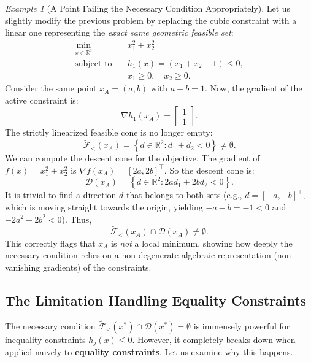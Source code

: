 \documentclass[11pt]{article}
\theoremstyle{definition}
\theoremstyle{plain}
\theoremstyle{remark}
\newtheorem{example}{Example}
\begin{document}
\begin{example}[A Point Failing the Necessary Condition Appropriately]
  Let us slightly modify the previous problem by replacing the cubic constraint with a linear one representing the \emph{exact same geometric feasible set}:
  \begin{align*}
    \min_{x \in \mathbb{R}^2} \quad & x_1^2 + x_2^2 \\
    \text{subject to} \quad & h_1(x) = (x_1 + x_2 - 1) \leq 0, \\
    & x_1 \geq 0, \quad x_2 \geq 0.
  \end{align*}
  Consider the same point $x_A = (a,b)$ with $a+b=1$. Now, the gradient of the active constraint is:
  \[
    \nabla h_1(x_A) = \begin{bmatrix} 1 \\ 1 \end{bmatrix}.
  \]
  The strictly linearized feasible cone is no longer empty:
  \[
    \widetilde{\mathcal{F}}_{<}(x_A) = \left\{ d \in \mathbb{R}^2 : d_1 + d_2 < 0 \right\} \neq \emptyset.
  \]
  We can compute the descent cone for the objective. The gradient of $f(x)=x_1^2+x_2^2$ is $\nabla f(x_A) = [2a, 2b]^\top$. So the descent cone is:
  \[
    \mathcal{D}(x_A) = \left\{ d \in \mathbb{R}^2 : 2a d_1 + 2b d_2 < 0 \right\}.
  \]
  It is trivial to find a direction $d$ that belongs to both sets (e.g., $d = [-a, -b]^\top$, which is moving straight towards the origin, yielding $-a-b = -1 < 0$ and $-2a^2-2b^2 < 0$). Thus,
  \[
    \widetilde{\mathcal{F}}_{<}(x_A) \cap \mathcal{D}(x_A) \neq \emptyset.
  \]
  This correctly flags that $x_A$ is \emph{not} a local minimum, showing how deeply the necessary condition relies on a non-degenerate algebraic representation (non-vanishing gradients) of the constraints.
\end{example}

\subsection{The Limitation Handling Equality Constraints}

The necessary condition $\widetilde{\mathcal{F}}_{<}(x^*) \cap \mathcal{D}(x^*) = \emptyset$ is immensely powerful for inequality constraints $h_j(x) \leq 0$. However, it completely breaks down when applied naively to \textbf{equality constraints}. Let us examine why this happens.
\end{document}

